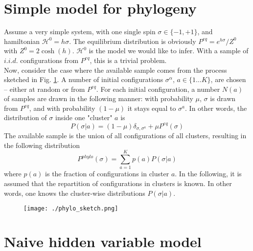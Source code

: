 \documentclass[10pt]{article}
\begin{document}
	
	\section{Simple model for phylogeny} %
	\label{sec:simple_model}
	
	Assume a very simple system, with one single spin $\sigma\in\{-1,+1\}$, and hamiltonian $\mathcal{H}^0=h\sigma$. The equilibrium distribution is obviously $P^{eq} = e^{h\sigma}/Z^0$ with $Z^0 = 2\cosh(h)$. $\mathcal{H}^0$ is the model we would like to infer. With a sample of $i.i.d.$ configurations from $P^{eq}$, this is a trivial problem. \\
	Now, consider the case where the available sample comes from the process sketched in Fig. \ref{fig:phylo_sketch}. A number of initial configurations $\sigma^\alpha$, $a\in\{1\ldots K\}$, are chosen -- either at random or from $P^{eq}$. For each initial configuration, a number $N(a)$ of samples are drawn in the following manner: with probability $\mu$, $\sigma$ is drawn from $P^{eq}$, and with probability $(1-\mu)$ it stays equal to $\sigma^a$. In other words, the distribution of $\sigma$ inside one "cluster" $a$ is 
	\begin{equation}
		\label{eq:one_cluster}
		P(\sigma\vert a) = (1-\mu)\delta_{\sigma,\sigma^a} + \mu P^{eq}(\sigma)
	\end{equation}
	The available sample is the union of all configurations of all clusters, resulting in the following distribution 
	\begin{equation}
		\label{eq:all_clusters}
		P^{phylo}(\sigma) = \sum_{a=1}^K p(a)P(\sigma\vert a)
	\end{equation}
	where $p(a)$ is the fraction of configurations in cluster $a$. In the following, it is assumed that the repartition of configurations in clusters is known. In other words, one knows the cluster-wise distributions $P(\sigma\vert a)$.

	\begin{figure}[h!]
	\centering
		\texttt{[image: ./phylo\_sketch.png]}
		\caption{}
		\label{fig:phylo_sketch}
	\end{figure}  


	\section{Naive hidden variable model} %
	\label{sec:naive_hidden_variable_model}
\end{document}

